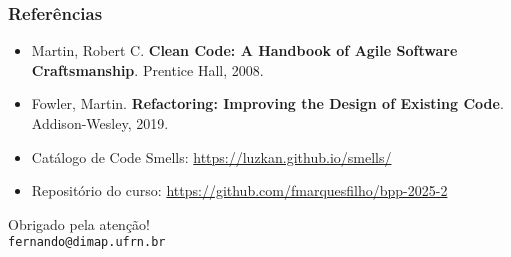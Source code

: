 \documentclass[aspectratio=169]{beamer}
\begin{document}
\begin{frame}
\frametitle{Referências}

\scriptsize
\begin{itemize}
    \item Martin, Robert C. \textbf{Clean Code: A Handbook of Agile Software Craftsmanship}. Prentice Hall, 2008.
    \item Fowler, Martin. \textbf{Refactoring: Improving the Design of Existing Code}. Addison-Wesley, 2019.
    \item Catálogo de Code Smells: \url{https://luzkan.github.io/smells/}
    \item Repositório do curso: \url{https://github.com/fmarquesfilho/bpp-2025-2}
\end{itemize}

\vspace{0.5cm}
\begin{center}
\Large
Obrigado pela atenção!\\
\vspace{0.3cm}
\normalsize
\texttt{fernando@dimap.ufrn.br}
\end{center}
\end{frame}
\end{document}
